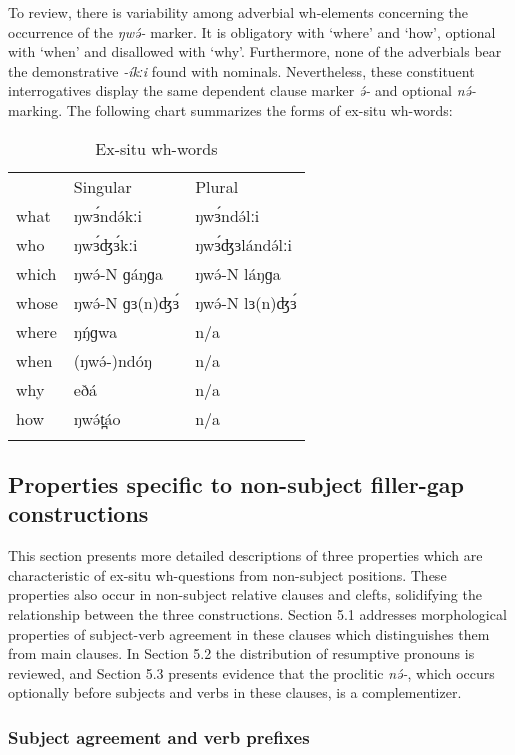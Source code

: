 To review, there is variability among adverbial wh-elements concerning the occurrence of the \textit{ŋwə́-} marker. It is obligatory with ‘where’ and ‘how’, optional with ‘when’ and disallowed with ‘why’. Furthermore, none of the adverbials bear the demonstrative \textit{-íkːi} found with nominals. Nevertheless, these constituent interrogatives display the same dependent clause marker \textit{ə́-} and optional \textit{nə́-} marking. The following chart summarizes the forms of ex-situ wh-words: 

\begin{table}
	\caption{Ex-situ wh-words}
	\label{Ch19:2}
	\begin{tabular}[t]{lll}
	\lsptoprule
&	Singular	&	Plural\\
what	&	ŋwɜ́ndə́kːi	&	ŋwɜ́ndə́lːi\\
who	&	ŋwɜ́ʤɜ́kːi	&	ŋwɜ́ʤɜlándə́lːi\\
which	&	ŋwə́-N  ɡáŋɡa	&	ŋwə́-N láŋɡa\\
whose	&	ŋwə́-N  ɡɜ(n)ʤɜ́	&	ŋwə́-N lɜ(n)ʤɜ́\\
where	&	ŋŋ́ɡwa	&	n/a\\
when	&	(ŋwə́-)ndóŋ	&	n/a\\
why	&	eðá	&	n/a\\
how	&	ŋwə́t̪áo	&	n/a\\
	\lspbottomrule
	\end{tabular}
\end{table}


\subsection{Properties specific to non-subject filler-gap constructions}

This section presents more detailed descriptions of three properties which are characteristic of ex-situ wh-questions from non-subject positions. These properties also occur in non-subject relative clauses and clefts, solidifying the relationship between the three constructions. Section 5.1 addresses morphological properties of subject-verb agreement in these clauses which distinguishes them from main clauses. In Section 5.2 the distribution of resumptive pronouns is reviewed, and Section 5.3 presents evidence that the proclitic \textit{nə́-}, which occurs optionally before subjects and verbs in these clauses, is a complementizer.

\subsubsection{Subject agreement and verb prefixes}

